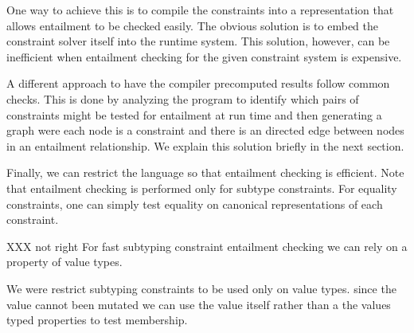 One way to achieve this is to compile the constraints into a representation
that allows entailment to be checked easily. The obvious solution is to embed
the constraint solver itself into the runtime system.
This solution,  however, can be inefficient when
entailment checking for the given constraint system is expensive.

A different approach to have the compiler precomputed results follow common
checks. This is done by analyzing the program to identify which pairs of
constraints might be tested for entailment at run time and then generating a
graph were each node is a constraint and there is an directed edge between
nodes in an entailment relationship.
We explain this solution briefly in the next section.

Finally, we can restrict the language so that entailment checking is
efficient. Note that entailment checking is performed only for subtype
constraints. For equality constraints, one can  simply test equality on
canonical representations of each constraint.

XXX not right
For fast subtyping constraint entailment checking we can rely on a property of value types.

We were  restrict subtyping constraints to be used only on value types.  since
the value cannot been mutated we can use the value itself rather than a the
values typed properties to test membership.

